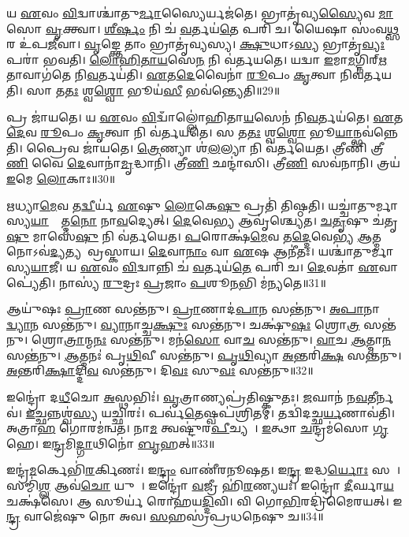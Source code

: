𑌯 \ul{𑌏}𑌵𑌂 \ul{𑌵𑌿}𑌦𑍍𑌵𑌾𑌶𑍍𑌚𑌾॑𑌤𑍁\ul{𑌰𑍍𑌮𑌾}𑌸𑍍𑌯𑍈𑌰𑍍𑌯𑌜॑𑌤𑍇।
𑌭𑍍𑌰𑌾𑌤𑍃॑𑌵𑍍𑌯\ul{𑌸𑍍𑌯𑍈}𑌵 \ul{𑌮𑌾}𑌸𑍋 \ul{𑌵𑍃}𑌕𑍍𑌤𑍍𑌵𑌾।
\ul{𑌶𑍀}\ul{𑌰𑍍}𑌷𑌂 𑌨𑌿 𑌚॑ \ul{𑌵}𑌰𑍍𑌤𑌯॑\ul{𑌤𑍇} 𑌪𑌰𑌿॑ 𑌚।
𑌯𑍈𑌷𑌾 𑌸𑌂॑𑌵\ul{𑌥𑍍𑌸}𑌰 𑌉॑𑌪\ul{𑌜𑍀}𑌵𑌾।
\ul{𑌵𑍃}𑌙𑍍𑌕𑍍𑌤𑍇 𑌤𑌾𑌂 𑌭𑍍𑌰𑌾𑌤𑍃॑𑌵𑍍𑌯𑌸𑍍𑌯।
\ul{𑌕𑍍𑌷𑍁}𑌧𑌾\-𑌽\ul{𑌸𑍍𑌯} 𑌭𑍍𑌰𑌾𑌤𑍃॑\ul{𑌵𑍍𑌯𑌃} 𑌪𑌰𑌾॑ 𑌭𑌵𑌤𑌿।
\ul{𑌲𑍋}\ul{𑌹𑌿}\ul{𑌤𑌾}\ul{𑌯}𑌸𑍇\ul{𑌨} 𑌨𑌿 𑌵॑𑌰𑍍𑌤𑌯𑌤𑍇।
𑌯𑌦𑍍𑌵𑌾 \ul{𑌇}𑌮𑌾\ul{𑌮}𑌗𑍍𑌨𑌿𑌰𑍍\mbox{}\ul{𑌋}𑌤𑌾𑌵𑌾𑌗॑𑌤𑍇 𑌨𑌿\ul{𑌵}𑌰𑍍𑌤𑌯॑𑌤𑌿।
\ul{𑌏}𑌤\ul{𑌦𑍇}𑌵𑍈𑌨𑌾॑ \ul{𑌰𑍂}𑌪𑌂 \ul{𑌕𑍃}𑌤𑍍𑌵𑌾 𑌨𑌿𑌵॑𑌰𑍍𑌤𑌯𑌤𑌿।
𑌸𑌾 𑌤\ul{𑌤𑌃} 𑌶𑍍𑌵\ul{𑌶𑍍𑌵𑍋} 𑌭𑍂𑌯॑\ul{𑌸𑍀} 𑌭𑌵॑𑌨𑍍𑌤𑍍𑌯𑍇𑌤𑌿॥29॥

𑌪𑍍𑌰 𑌜𑌾॑𑌯𑌤𑍇।
𑌯 \ul{𑌏}𑌵𑌂 \ul{𑌵𑌿}𑌦𑍍𑌵𑌾𑌁𑌲𑍍𑌲𑍋॑𑌹𑌿𑌤𑌾\ul{𑌯}𑌸𑍇𑌨॑ 𑌨𑌿\ul{𑌵}𑌰𑍍𑌤𑌯॑𑌤𑍇।
\ul{𑌏}𑌤\ul{𑌦𑍇}𑌵 \ul{𑌰𑍂}𑌪𑌂 \ul{𑌕𑍃}𑌤𑍍𑌵𑌾 𑌨𑌿 𑌵॑𑌰𑍍𑌤𑌯𑌤𑍇।
𑌸 𑌤\ul{𑌤𑌃} 𑌶𑍍𑌵\ul{𑌶𑍍𑌵𑍋} 𑌭𑍂\ul{𑌯𑌾}𑌨𑍍𑌭𑌵॑𑌨𑍍𑌨𑍇𑌤𑌿।
𑌪𑍍𑌰𑍈𑌵 𑌜𑌾॑𑌯𑌤𑍇।
\ul{𑌤𑍍𑌰𑍇}𑌣𑍍𑌯𑌾 𑌶॑\ul{𑌲}𑌲𑍍𑌯𑌾 𑌨𑌿 𑌵॑𑌰𑍍𑌤𑌯𑍇𑌤।
𑌤𑍍𑌰𑍀𑌣𑌿॑ 𑌤𑍍𑌰𑍀\ul{𑌣𑌿} 𑌵𑍈 \ul{𑌦𑍇}𑌵𑌾𑌨𑌾॑\ul{𑌮𑍃}𑌦𑍍𑌧𑌾𑌨𑌿॑।
𑌤𑍍𑌰𑍀\ul{𑌣𑌿} 𑌛𑌨𑍍𑌦𑌾॑𑌸𑌿।
𑌤𑍍𑌰𑍀\ul{𑌣𑌿} 𑌸𑌵॑𑌨𑌾𑌨𑌿।
𑌤𑍍𑌰𑌯॑ \ul{𑌇}𑌮𑍇 \ul{𑌲𑍋}𑌕𑌾𑌃॥30॥

\ul{𑌋}𑌧𑍍𑌯𑌾\ul{𑌮𑍇}𑌵 𑌤\ul{𑌦𑍍𑌵𑍀}𑌰𑍍𑌯॑ \ul{𑌏}𑌷𑍁 \ul{𑌲𑍋}𑌕𑍇\ul{𑌷𑍁} 𑌪𑍍𑌰𑌤𑌿॑ 𑌤𑌿𑌷𑍍𑌠𑌤𑌿।
𑌯𑌚𑍍𑌚𑌾॑𑌤𑍁𑌰𑍍𑌮𑌾𑌸𑍍𑌯\-\ul{𑌯𑌾}𑌜𑍍𑌯𑌾᳚𑌤𑍍𑌮\ul{𑌨𑍋} 𑌨𑌾\ul{𑌵}𑌦𑍍𑌯𑍇𑌤𑍍।
\ul{𑌦𑍇}𑌵𑍇\ul{𑌭𑍍𑌯} 𑌆𑌵𑍃॑𑌶𑍍𑌚𑍍𑌯𑍇𑌤।
\ul{𑌚}\ul{𑌤𑍃}𑌷𑍁 𑌚॑𑌤𑍃\ul{𑌷𑍁} 𑌮𑌾𑌸𑍇॑\ul{𑌷𑍁} 𑌨𑌿 𑌵॑𑌰𑍍𑌤𑌯𑍇𑌤।
\ul{𑌪}𑌰𑍋𑌕𑍍𑌷॑\ul{𑌮𑍇}𑌵 𑌤\ul{𑌦𑍍𑌦𑍇}𑌵𑍇𑌭𑍍𑌯॑ \ul{𑌆}𑌤𑍍𑌮𑌨𑍋\-𑌽𑌵॑\ul{𑌦𑍍𑌯}𑌤𑍍𑌯𑌨𑌾᳚\-𑌵𑍍𑌰𑌸𑍍𑌕𑌾𑌯।
\ul{𑌦𑍇}𑌵𑌾\ul{𑌨𑌾𑌂} 𑌵𑌾 \ul{𑌏}𑌷 𑌆𑌨𑍀॑𑌤𑌃।
𑌯𑌶𑍍𑌚𑌾॑𑌤𑍁𑌰𑍍𑌮𑌾𑌸𑍍𑌯\ul{𑌯𑌾}𑌜𑍀।
𑌯 \ul{𑌏}𑌵𑌂 \ul{𑌵𑌿}𑌦𑍍𑌵𑌾𑌨𑍍𑌨𑌿 𑌚॑ \ul{𑌵}𑌰𑍍𑌤𑌯॑\ul{𑌤𑍇} 𑌪𑌰𑌿॑ 𑌚।
\ul{𑌦𑍇}𑌵𑌤𑌾॑ \ul{𑌏}𑌵𑌾𑌪𑍍𑌯𑍇॑𑌤𑌿।
𑌨𑌾𑌸𑍍𑌯॑ \ul{𑌰𑍁}𑌦𑍍𑌰𑌃 \ul{𑌪𑍍𑌰}𑌜𑌾𑌂 \ul{𑌪}𑌶𑍂\ul{𑌨}𑌭𑌿 𑌮॑𑌨𑍍𑌯𑌤𑍇॥31॥\anuvakamend[\ul{𑌏}\ul{𑌤𑍍𑌯𑍇}\ul{𑌤𑍍𑌯}\ul{𑌯𑍁}\ul{𑌞𑍍𑌜}𑌤𑌾𑌸𑍁॑𑌰𑌾 𑌏𑌤𑌿 \ul{𑌲𑍋}𑌕𑌾 𑌮॑𑌨𑍍𑌯𑌤𑍇]

𑌆𑌯𑍁॑𑌷𑌃 \ul{𑌪𑍍𑌰𑌾}𑌣 𑌸𑌨𑍍𑌤॑𑌨𑍁।
\ul{𑌪𑍍𑌰𑌾}𑌣𑌾𑌦॑\ul{𑌪𑌾}𑌨 𑌸𑌨𑍍𑌤॑𑌨𑍁।
\ul{𑌅}\ul{𑌪𑌾}𑌨𑌾\ul{𑌦𑍍𑌵𑍍𑌯𑌾}𑌨 𑌸𑌨𑍍𑌤॑𑌨𑍁।
\ul{𑌵𑍍𑌯𑌾}𑌨𑌾𑌚𑍍𑌚\ul{𑌕𑍍𑌷𑍁𑌃} 𑌸𑌨𑍍𑌤॑𑌨𑍁।
𑌚𑌕𑍍𑌷𑍁॑\ul{𑌷𑌃} 𑌶𑍍𑌰𑍋\ul{𑌤𑍍𑌰}\ul{} 𑌸𑌨𑍍𑌤॑𑌨𑍁।
𑌶𑍍𑌰𑍋\ul{𑌤𑍍𑌰𑌾}𑌨𑍍𑌮\ul{𑌨𑌃} 𑌸𑌨𑍍𑌤॑𑌨𑍁।
𑌮𑌨॑\ul{𑌸𑍋} 𑌵𑌾\ul{𑌚}\ul{} 𑌸𑌨𑍍𑌤॑𑌨𑍁।
\ul{𑌵𑌾}𑌚 \ul{𑌆}𑌤𑍍𑌮𑌾\ul{𑌨}\ul{} 𑌸𑌨𑍍𑌤॑𑌨𑍁।
\ul{𑌆}𑌤𑍍𑌮𑌨𑌃॑ 𑌪𑍃\ul{𑌥𑌿}𑌵𑍀 𑌸𑌨𑍍𑌤॑𑌨𑍁।
\ul{𑌪𑍃}\ul{𑌥𑌿}𑌵𑍍𑌯𑌾 \ul{𑌅}𑌨𑍍𑌤𑌰𑌿॑\ul{𑌕𑍍𑌷}\ul{} 𑌸𑌨𑍍𑌤॑𑌨𑍁।
\ul{𑌅}𑌨𑍍𑌤𑌰𑌿॑\ul{𑌕𑍍𑌷𑌾}𑌦𑍍𑌦𑌿\ul{𑌵}\ul{} 𑌸𑌨𑍍𑌤॑𑌨𑍁।
𑌦𑌿\ul{𑌵𑌃} 𑌸𑍁\ul{𑌵𑌃} 𑌸𑌨𑍍𑌤॑𑌨𑍁॥32॥\anuvakamend[\ul{𑌅}𑌨𑍍𑌤𑌰𑌿॑\ul{𑌕𑍍𑌷}\ul{\dng{ꣳ}} 𑌸𑌨𑍍𑌤॑\ul{𑌨𑍁} 𑌦𑍍𑌵𑍇 𑌚॑]

𑌇𑌨𑍍𑌦𑍍𑌰𑍋॑ 𑌦\ul{𑌧𑍀}𑌚𑍋 \ul{𑌅}𑌸𑍍𑌥𑌭𑌿𑌃॑।
\ul{𑌵𑍃}𑌤𑍍𑌰𑌾𑌣𑍍𑌯𑌪𑍍𑌰॑𑌤𑌿𑌷𑍍𑌕𑍁𑌤𑌃।
\ul{𑌜}𑌘𑌾𑌨॑ 𑌨\ul{𑌵}𑌤𑍀𑌰𑍍𑌨𑌵॑।
\ul{𑌇}𑌚𑍍𑌛𑌨𑍍𑌨𑌶𑍍𑌵॑\ul{𑌸𑍍𑌯} 𑌯𑌚𑍍𑌛𑌿𑌰𑌃॑।
𑌪𑌰𑍍𑌵॑\ul{𑌤𑍇}𑌷𑍍𑌵𑌪॑𑌶𑍍𑌰𑌿𑌤𑌮𑍍।
𑌤𑌦𑍍𑌵𑌿॑𑌦𑌚𑍍𑌛\ul{𑌰𑍍𑌯}𑌣𑌾𑌵॑𑌤𑌿।
𑌅𑌤𑍍𑌰𑌾\ul{𑌹} 𑌗𑍋𑌰𑌮॑𑌨𑍍𑌵𑌤।
𑌨𑌾\ul{𑌮} 𑌤𑍍𑌵𑌷𑍍𑌟𑍁॑𑌰\ul{𑌪𑍀}𑌚𑍍𑌯𑌮𑍍᳚।
\ul{𑌇}𑌤𑍍𑌥𑌾 \ul{𑌚}𑌨𑍍𑌦𑍍𑌰𑌮॑𑌸𑍋 \ul{𑌗𑍃}𑌹𑍇।
𑌇\ul{𑌨𑍍𑌦𑍍𑌰}𑌮𑌿\ul{𑌦𑍍𑌗𑌾}𑌥𑌿𑌨𑍋॑ \ul{𑌬𑍃}𑌹𑌤𑍍॥33॥

𑌇𑌨𑍍𑌦𑍍𑌰॑\ul{𑌮}𑌰𑍍𑌕𑍇𑌭𑌿॑\ul{𑌰}𑌰𑍍𑌕𑌿𑌣𑌃॑।
𑌇\ul{𑌨𑍍𑌦𑍍𑌰𑌂} 𑌵𑌾𑌣𑍀॑𑌰𑌨𑍂𑌷𑌤।
𑌇\ul{𑌨𑍍𑌦𑍍𑌰} 𑌇𑌦𑍍𑌧\ul{𑌰𑍍𑌯𑍋𑌃} 𑌸𑌚𑌾᳚।
𑌸𑌮𑍍𑌮𑌿॑\ul{𑌶𑍍𑌲} 𑌆𑌵॑\ul{𑌚𑍋} 𑌯𑍁𑌜𑌾᳚।
𑌇𑌨𑍍𑌦𑍍𑌰𑍋॑ \ul{𑌵}𑌜𑍍𑌰𑍀 𑌹𑌿॑\ul{𑌰}𑌣𑍍𑌯𑌯𑌃॑।
𑌇𑌨𑍍𑌦𑍍𑌰𑍋॑ \ul{𑌦𑍀}𑌰𑍍𑌘𑌾\ul{𑌯} 𑌚𑌕𑍍𑌷॑𑌸𑍇।
𑌆 𑌸𑍂𑌰𑍍𑌯॑ 𑌰𑍋𑌹𑌯\ul{𑌦𑍍𑌦𑌿}𑌵𑌿।
𑌵𑌿 𑌗𑍋\ul{𑌭𑌿}𑌰𑌦𑍍𑌰𑌿॑𑌮𑍈𑌰𑌯𑌤𑍍।
𑌇\ul{𑌨𑍍𑌦𑍍𑌰} 𑌵𑌾𑌜𑍇॑𑌷𑍁 𑌨𑍋 𑌅𑌵।
\ul{𑌸}𑌹𑌸𑍍𑌰॑𑌪𑍍𑌰𑌧𑌨𑍇𑌷𑍁 𑌚॥34॥


